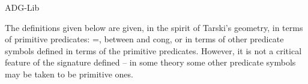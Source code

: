 \documentclass[a4wide,9pt,landscape]{article}
\begin{document}

\pagestyle{empty}

\begin{center}
{\huge ADG-Lib }
\end{center}

The definitions given below are given, in the spirit
of Tarski's geometry, in terms of primitive predicates: 
{\ttfamily =}, {\ttfamily between} and {\ttfamily cong}, 
or in terms of other predicate symbols defined in terms 
of the primitive predicates.
However, it is not a critical feature of the signature 
defined -- in some theory some other predicate symbols 
may be taken to be primitive ones.
\end{document}
